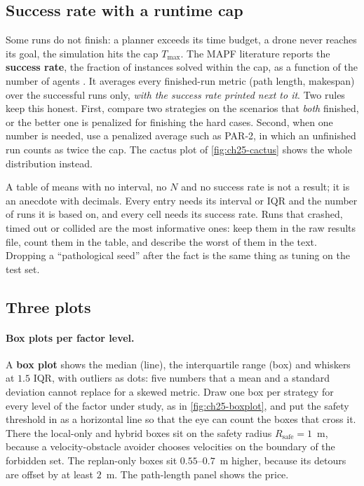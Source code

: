 \subsection{Success rate with a runtime cap}

Some runs do not finish: a planner exceeds its time budget, a drone never
reaches its goal, the simulation hits the cap $T_{\max}$. The MAPF
literature reports the \textbf{success rate}, the
fraction of instances solved within the cap, as a function of the number of
agents \cite{sharon2015cbs,barer2014ecbs,stern2019mapf}. It averages every
finished-run metric (path length, makespan) over the successful runs only,
\emph{with the success rate printed next to it}. Two rules keep this
honest. First, compare two strategies on the scenarios that \emph{both}
finished, or the better one is penalized for finishing the hard cases.
Second, when one number is needed, use a penalized average such as
PAR-2, in which an unfinished run counts as twice the
cap. The cactus plot of
\cref{fig:ch25-cactus} shows the whole distribution instead.

\begin{pitfall}
A table of means with no interval, no $N$ and no success rate is not a
result; it is an anecdote with decimals. Every entry needs its interval or
IQR and the number of runs it is based on, and every cell needs its success
rate. Runs that crashed, timed out or collided are the most informative
ones: keep them in the raw results file, count them in the table, and
describe the worst of them in the text. Dropping a ``pathological seed''
after the fact is the same thing as tuning on the test set.
\end{pitfall}

\subsection{Three plots}

\paragraph{Box plots per factor level.}
A \textbf{box plot} shows the median (line), the
interquartile range (box) and whiskers at $1.5$ IQR, with outliers as dots:
five numbers that a mean and a standard deviation cannot replace for a
skewed metric. Draw one box per strategy for every level of the factor
under study, as in \cref{fig:ch25-boxplot}, and put the safety threshold in
as a horizontal line so that the eye can count the boxes that cross it.
There the local-only and hybrid boxes sit on the safety radius
$R_{\mathrm{safe}} = 1$~m, because a velocity-obstacle avoider chooses
velocities on the boundary of the forbidden set. The replan-only boxes
sit $0.55$--$0.7$~m higher, because its detours are offset by at least
$2$~m. The path-length panel shows the price.

